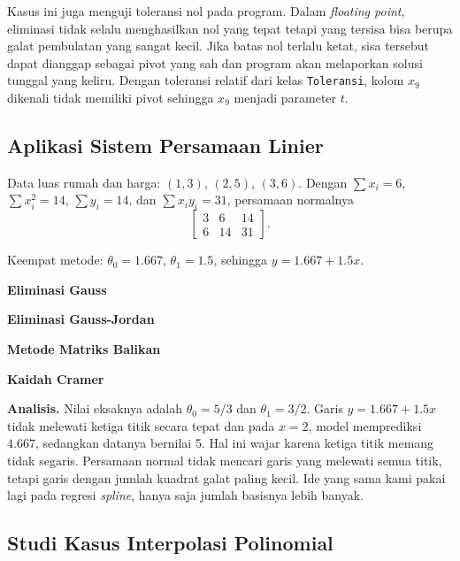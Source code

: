 Kasus ini juga menguji toleransi nol pada program. Dalam \textit{floating point}, eliminasi tidak selalu menghasilkan nol yang tepat tetapi yang tersisa bisa berupa galat pembulatan yang sangat kecil. Jika batas nol terlalu ketat, sisa tersebut dapat dianggap sebagai pivot yang sah dan program akan melaporkan solusi tunggal yang keliru. Dengan toleransi relatif dari kelas \texttt{Toleransi}, kolom $x_9$ dikenali tidak memiliki pivot sehingga $x_9$ menjadi parameter $t$.

\subsection{Aplikasi Sistem Persamaan Linier}

\begin{kasus}
Data luas rumah dan harga: $(1, 3)$, $(2, 5)$, $(3, 6)$. Dengan $\sum x_i = 6$, $\sum x_i^2 = 14$, $\sum y_i = 14$, dan $\sum x_i y_i = 31$, persamaan normalnya
\[
\left[\begin{array}{cc|c}
3 & 6 & 14 \\
6 & 14 & 31
\end{array}\right].
\]
\begin{center}
Keempat metode: $\theta_0 = 1.667$, $\theta_1 = 1.5$, sehingga $y = 1.667 + 1.5x$.
\end{center}
\textbf{Eliminasi Gauss}

\textbf{Eliminasi Gauss-Jordan}

\textbf{Metode Matriks Balikan}

\textbf{Kaidah Cramer}
\end{kasus}

\textbf{Analisis.} Nilai eksaknya adalah $\theta_0 = 5/3$ dan $\theta_1 = 3/2$. Garis $y = 1.667 + 1.5x$ tidak melewati ketiga titik secara tepat dan pada $x = 2$, model memprediksi $4.667$, sedangkan datanya bernilai 5. Hal ini wajar karena ketiga titik memang tidak segaris. Persamaan normal tidak mencari garis yang melewati semua titik, tetapi garis dengan jumlah kuadrat galat paling kecil. Ide yang sama kami pakai lagi pada regresi \textit{spline}, hanya saja jumlah basisnya lebih banyak.

\subsection{Studi Kasus Interpolasi Polinomial}

